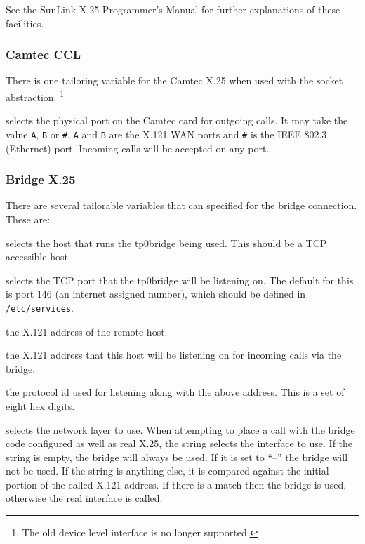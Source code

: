 See the SunLink X.25 Programmer's Manual for
further explanations of these
facilities.

\subsubsection{Camtec CCL}
There is one tailoring variable for the Camtec X.25 when used
with the socket abstraction.%
\footnote{The old device level interface is no longer supported.}
\begin{describe}
\item[\verb"x25\_outgoing\_port"] selects the physical port on the
Camtec card for outgoing calls.
It may take the value \verb"A", \verb"B" or \verb"#".
\verb"A" and \verb"B" are the X.121 WAN ports and \verb"#" is
the IEEE 802.3 (Ethernet) port.
Incoming calls will be accepted on any port.
\end{describe}

\subsubsection{Bridge X.25}
There are several tailorable variables that can specified for the
bridge connection. These are:
\begin{describe}
\item[\verb|x25\_bridge\_host|]	selects the host that runs the
tp0bridge being used. This should be a TCP accessible host.

\item[\verb|x25\_bridge\_port|]	selects the TCP port that the
tp0bridge will be listening on. The default for this is port 146 (an
internet assigned number), which should be defined in \verb|/etc/services|.

\item[\verb|x25\_bridge\_addr|]	the X.121 address of the remote host.

\item[\verb|x25\_bridge\_listen|]	the X.121 address that this host will
be listening on for incoming calls via the bridge.

\item[\verb|x25\_bridge\_pid|]	the protocol id used for listening
along with the above address. This is a set of eight hex digits.

\item[\verb|x25\_bridge\_discrim|] selects the network layer to use.
When attempting to place a call with the bridge code configured as
well as real X.25, the string selects the interface to use. If the
string is empty, the bridge will always be used. If it is set to
``--'' the bridge will not be used. If the string is anything else, it
is compared against the initial portion of the called X.121 address.
If there is a match then the bridge is used, otherwise the real
interface is called.
\end{describe}

